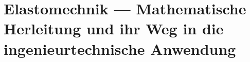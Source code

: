 %
%
%
%
\chapter{Elastomechnik --- Mathematische Herleitung und ihr Weg in die ingenieurtechnische Anwendung\label{chapter:elastomechanik}}
\begin{refsection}








\printbibliography[heading=subbibliography]
\end{refsection}
